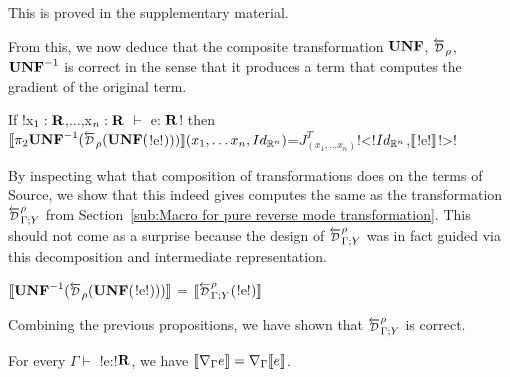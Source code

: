 This is proved in the supplementary material.

From this, we now deduce that the composite transformation $\mathbf{UNF}$, $\Dsynrevsymbol_{\rho}$, $\mathbf{UNF}^{-1}$ is correct
in the sense that it produces a term that computes the gradient of the original term.

\begin{proposition}
    If !x$_1:\mathbf{R}$,$\ldots$,x$_n:\mathbf{R}$ $\vdash$ e: $\mathbf{R}$! then \\
    $\seml \pi_2 \UNFSymbol^{-1}(\Dsynrevsymbol_{\rho}(\UNFSymbol($!e!$)))\rrbracket(x_1,\ldots x_n,Id_{\mathbb{R}^n})$=$J^T_{(x_1,\ldots x_n)}$!<!$Id_{\mathbb{R}^n}$,$\llbracket$!e!$\rrbracket$!>!
\end{proposition}

By inspecting what that composition of transformations does on the terms of Source, 
we show that this indeed gives computes the same as the transformation 
$\directD{\rho}{\Gamma}{Y}$ from Section~\ref{sub:Macro for pure reverse mode transformation}. 
This should not come as a surprise because the design of $\directD{\rho}{\Gamma}{Y}$ was in fact guided via 
this decomposition and intermediate representation.

\begin{proposition}
    $\seml\UNFSymbol^{-1}(\Dsynrevsymbol_{\rho}(\UNFSymbol($!e!$)))\rrbracket$ = $\seml\directD{\rho}{\Gamma}{Y}($!e!$)\rrbracket$ 
\end{proposition}

Combining the previous propositions, we have shown that $\directD{\rho}{\Gamma}{Y}$ is correct.

\begin{theorem}
    For every $\Gamma \vdash$ !e:!$\mathbf{R}$, we have 
    $\llbracket \nabla_\Gamma e\rrbracket= \nabla_\Gamma\llbracket e\rrbracket$.
\end{theorem}